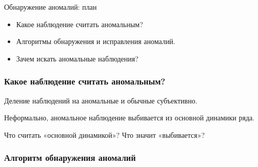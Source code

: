 
\begin{frame} %


\end{frame}



\begin{frame}{Обнаружение аномалий: план}
  \begin{itemize}[<+->]
    \item Какое наблюдение считать аномальным? 
    \item Алгоритмы обнаружения и исправления аномалий.
    \item Зачем искать аномальные наблюдения?
  \end{itemize}

\end{frame}


\begin{frame}
  \frametitle{Какое наблюдение считать аномальным?}


  \pause 
  Деление наблюдений на аномальные и обычные \alert{субъективно}.

  \pause
  Неформально, аномальное наблюдение \alert{выбивается} из \alert{основной динамики} ряда. 

  \pause
  Что считать «основной динамикой»? Что значит «выбивается»?

\end{frame}

\begin{frame}
  \frametitle{Алгоритм обнаружения аномалий}

  \begin{itemize}
    



  \end{itemize}
  
\end{frame}


